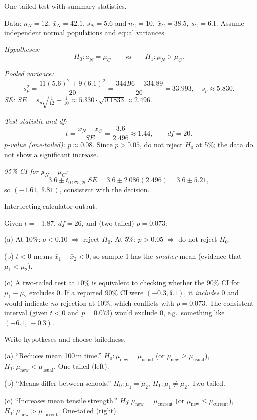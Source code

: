 \documentclass[11pt]{article}
\def\textbf#1{#1}%
\def\textit#1{#1}%
\def\mathrm#1{#1}%
\begin{document}
\begin{solution}
\textbf{One-tailed test with summary statistics.}

Data: $n_N=12,\ \bar x_N=42.1,\ s_N=5.6$ and $n_C=10,\ \bar x_C=38.5,\ s_C=6.1$.
Assume independent normal populations and equal variances.

\emph{Hypotheses:}
\[
H_0:\mu_N=\mu_C \qquad\text{vs}\qquad H_1:\mu_N>\mu_C .
\]

\emph{Pooled variance:}
\[
s_p^2=\frac{11(5.6)^2+9(6.1)^2}{20}=\frac{344.96+334.89}{20}=33.993,\quad s_p\approx 5.830.
\]
\emph{SE:} $\mathrm{SE}=s_p\sqrt{\tfrac1{12}+\tfrac1{10}}\approx 5.830\cdot \sqrt{0.1833}\approx 2.496$.

\emph{Test statistic and df:}
\[
t=\frac{\bar x_N-\bar x_C}{\mathrm{SE}}=\frac{3.6}{2.496}\approx 1.44,\qquad \mathrm{df}=20.
\]
\emph{$p$-value (one-tailed):} $p\approx 0.08$.
Since $p>0.05$, \textbf{do not reject} $H_0$ at 5\%; the data do not show a significant increase.

\emph{95\% CI for $\mu_N-\mu_C$:}
\[
3.6\pm t_{0.975,20}\,\mathrm{SE}=3.6\pm 2.086(2.496)=3.6\pm 5.21,
\]
so $\boxed{(-1.61,\ 8.81)}$, consistent with the decision.
\end{solution}

\begin{solution}
\textbf{Interpreting calculator output.}

Given $t=-1.87$, $\mathrm{df}=26$, and (two-tailed) $p=0.073$:

(a) At $10\%$: $p<0.10$ $\Rightarrow$ \textbf{reject} $H_0$.
At $5\%$: $p>0.05$ $\Rightarrow$ \textbf{do not reject} $H_0$.

(b) $t<0$ means $\bar x_1-\bar x_2<0$, so sample 1 has the \emph{smaller} mean (evidence that $\mu_1<\mu_2$).

(c) A two-tailed test at $10\%$ is equivalent to checking whether the \textbf{90\%} CI for $\mu_1-\mu_2$ excludes $0$.
If a reported $90\%$ CI were $(-0.3, 6.1)$, it \emph{includes} $0$ and would indicate \emph{no} rejection at $10\%$,
which conflicts with $p=0.073$. The consistent interval (given $t<0$ and $p=0.073$) would exclude $0$, e.g.\ something like $\boxed{(-6.1,\,-0.3)}$.
\end{solution}

\begin{solution}
\textbf{Write hypotheses and choose tailedness.}

(a) “Reduces mean 100\,m time.” \quad
$H_0:\mu_{\text{new}}=\mu_{\text{usual}}$ (or $\mu_{\text{new}}\ge\mu_{\text{usual}}$), \;
$H_1:\mu_{\text{new}}<\mu_{\text{usual}}$. \textit{One-tailed (left).}

(b) “Means differ between schools.” \quad
$H_0:\mu_1=\mu_2$, \; $H_1:\mu_1\neq\mu_2$. \textit{Two-tailed.}

(c) “Increases mean tensile strength.” \quad
$H_0:\mu_{\text{new}}=\mu_{\text{current}}$ (or $\mu_{\text{new}}\le\mu_{\text{current}}$), \;
$H_1:\mu_{\text{new}}>\mu_{\text{current}}$. \textit{One-tailed (right).}
\end{solution}
\end{document}
